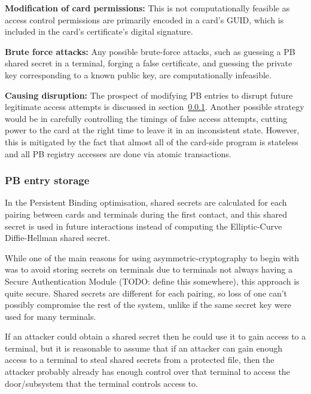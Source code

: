 \documentclass[12pt]{article}
\begin{document}
\textbf{Modification of card permissions:} This is not computationally feasible as access control permissions are primarily encoded in a card's GUID, which is included in the card's certificate's digital signature.

\textbf{Brute force attacks:} Any possible brute-force attacks, such as guessing a PB shared secret in a terminal, forging a false certificate, and guessing the private key corresponding to a known public key, are computationally infeasible.

\textbf{Causing disruption:} The prospect of modifying PB entries to disrupt future legitimate access attempts is discussed in section~\ref{subsec:pb_storage}. Another possible strategy would be in carefully controlling the timings of false access attempts, cutting power to the card at the right time to leave it in an inconsistent state. However, this is mitigated by the fact that almost all of the card-side program is stateless and all PB registry accesses are done via atomic transactions.





\subsubsection{PB entry storage}
\label{subsec:pb_storage}
In the Persistent Binding optimisation, shared secrets are calculated for each pairing between cards and terminals during the first contact, and this shared secret is used in future interactions instead of computing the Elliptic-Curve Diffie-Hellman shared secret.

While one of the main reasons for using asymmetric-cryptography to begin with was to avoid storing secrets on terminals due to terminals not always having a Secure Authentication Module (TODO: define this somewhere), this approach is quite secure. Shared secrets are different for each pairing, so loss of one can't possibly compromise the rest of the system, unlike if the same secret key were used for many terminals. 

If an attacker could obtain a shared secret then he could use it to gain access to a terminal, but it is reasonable to assume that if an attacker can gain enough access to a terminal to steal shared secrets from a protected file, then the attacker probably already has enough control over that terminal to access the door/subsystem that the terminal controls access to.
\end{document}
